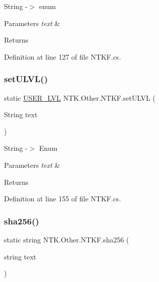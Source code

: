String -\/$>$ enum 


\begin{DoxyParams}{Parameters}
{\em text} & \\
\hline
\end{DoxyParams}
\begin{DoxyReturn}{Returns}

\end{DoxyReturn}


Definition at line 127 of file N\+T\+K\+F.\+cs.

\mbox{\label{class_n_t_k_1_1_other_1_1_n_t_k_f_a5a5bc29b7d394a4915f17c2ad4a95186}} 
\subsubsection{\texorpdfstring{setULVL()}{setULVL()}}
{\footnotesize\ttfamily static \mbox{\hyperlink{namespace_n_t_k_a1a2136a0cde3a719c9188a4d515e9f1b}{U\+S\+E\+R\+\_\+\+L\+VL}} N\+T\+K.\+Other.\+N\+T\+K\+F.\+set\+U\+L\+VL (\begin{DoxyParamCaption}\item[{String}]{text }\end{DoxyParamCaption})\hspace{0.3cm}{\ttfamily [static]}}



String -\/$>$ Enum 


\begin{DoxyParams}{Parameters}
{\em text} & \\
\hline
\end{DoxyParams}
\begin{DoxyReturn}{Returns}

\end{DoxyReturn}


Definition at line 155 of file N\+T\+K\+F.\+cs.

\mbox{\label{class_n_t_k_1_1_other_1_1_n_t_k_f_a1397497c20a5e46fad37a91e1acd3f5b}} 
\subsubsection{\texorpdfstring{sha256()}{sha256()}}
{\footnotesize\ttfamily static string N\+T\+K.\+Other.\+N\+T\+K\+F.\+sha256 (\begin{DoxyParamCaption}\item[{string}]{text }\end{DoxyParamCaption})\hspace{0.3cm}{\ttfamily [static]}}



